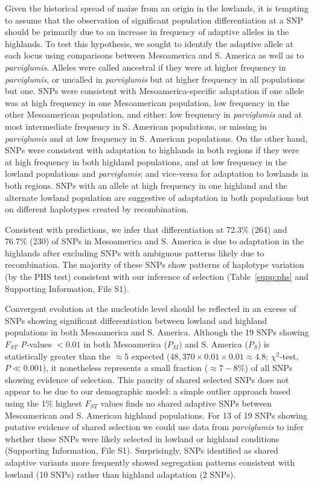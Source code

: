 Given the historical spread of maize from an origin in the lowlands, it is tempting to assume that the observation of significant population differentiation at a SNP should be primarily due to an increase in frequency of adaptive alleles in the highlands.
To test this hypothesis, we sought to identify the adaptive allele at each locus using comparisons between Mesoamerica and S. America as well as to \emph{parviglumis}. 
Alleles were called ancestral if they were at higher frequency in \emph{parviglumis}, or uncalled in \emph{parviglumis} but at higher frequency in all populations but one. 
SNPs were consistent with Mesoamerica-specific adaptation if one allele was at high frequency in one Mesoamerican population, low frequency in the other Mesoamerican population, and either: low frequency in \emph{parviglumis} and at most intermediate frequency in S. American populations, or missing in \emph{parviglumis} and at low frequency in S. American populations.
On the other hand, SNPs were consistent with adaptation to highlands in both regions if they were at high frequency in both highland populations, and at low frequency in the lowland populations and \emph{parviglumis}; and vice-versa for adaptation to lowlands in both regions.
SNPs with an allele at high frequency in one highland and the alternate lowland population are suggestive of adaptation in both populations but on different haplotypes created by recombination.

Consistent with predictions, we infer that differentiation at 72.3\% (264) and 76.7\% (230) of SNPs in Mesoamerica and S. America is due to adaptation in the highlands after excluding  SNPs with ambiguous patterns likely due to recombination. 
The majority of these SNPs show patterns of haplotype variation (by the PHS test) consistent with our inference of selection (Table~\ref{supp:phs} and Supporting Information, File S1).
   
Convergent evolution at the nucleotide level should be reflected in an excess of SNPs showing significant differentiation between lowland and highland populations in both Mesoamerica and S. America. 
Although the 19 SNPs showing $F_{ST}$ \emph{P}-values  $<0.01$ in both Mesoamerica ($P_M$) and S. America ($P_S$) is statistically greater than the $\approx 5$ expected ($48,370\times 0.01 \times 0.01 \approx 4.8$; $\chi^2$-test, $P\ll0.001$), it nonetheless represents a small fraction ($\approx 7-8\%$) of all SNPs showing evidence of selection.
This paucity of shared selected SNPs does not appear to be due to our demographic model: 
a simple outlier approach based using the 1\% highest $F_{ST}$ values finds no shared adaptive SNPs between Mesoamerican and S. American highland populations. 
For 13 of 19 SNPs showing putative evidence of shared selection we could use data from \textit{parviglumis} to infer whether these SNPs were likely selected in lowland or highland conditions (Supporting Information, File S1).  
Surprisingly, SNPs identified as shared adaptive variants more frequently showed segregation patterns consistent with lowland  (10 SNPs) rather than highland adaptation (2 SNPs). %

